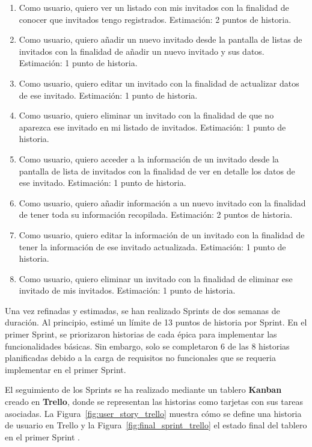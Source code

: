 \begin{enumerate}
  \item Como usuario, quiero ver un listado con mis invitados con la finalidad de conocer que invitados tengo registrados. Estimación: 2 puntos de historia.
  \item Como usuario, quiero añadir un nuevo invitado desde la pantalla de listas de invitados con la finalidad de añadir un nuevo invitado y sus datos. Estimación: 1 punto de historia.
  \item Como usuario, quiero editar un invitado con la finalidad de actualizar datos de ese invitado. Estimación: 1 punto de historia.
  \item Como usuario, quiero eliminar un invitado con la finalidad de que no aparezca ese invitado en mi listado de invitados. Estimación: 1 punto de historia.
  \item Como usuario, quiero acceder a la información de un invitado desde la pantalla de lista de invitados con la finalidad de ver en detalle los datos de ese invitado. Estimación: 1 punto de historia.
  \item Como usuario, quiero añadir información a un nuevo invitado con la finalidad de tener toda su información recopilada. Estimación: 2 puntos de historia.
  \item Como usuario, quiero editar la información de un invitado con la finalidad de tener la información de ese invitado actualizada. Estimación: 1 punto de historia.
  \item Como usuario, quiero eliminar un invitado con la finalidad de eliminar ese invitado de mis invitados. Estimación: 1 punto de historia.
\end{enumerate}

Una vez refinadas y estimadas, se han realizado Sprints de dos semanas de duración. Al principio, estimé un límite de 13 puntos de historia por Sprint. En el primer Sprint, se priorizaron historias de cada épica para implementar las funcionalidades básicas. Sin embargo, solo se completaron 6 de las 8 historias planificadas debido a la carga de requisitos no funcionales que se requeria implementar en el primer Sprint.

El seguimiento de los Sprints se ha realizado mediante un tablero \textbf{Kanban} creado en \textbf{Trello}, donde se representan las historias como tarjetas con sus tareas asociadas. La Figura~\ref{fig:user_story_trello} muestra cómo se define una historia de usuario en Trello y la Figura~\ref{fig:final_sprint_trello} el estado final del tablero en el primer Sprint \cite{trello}.

